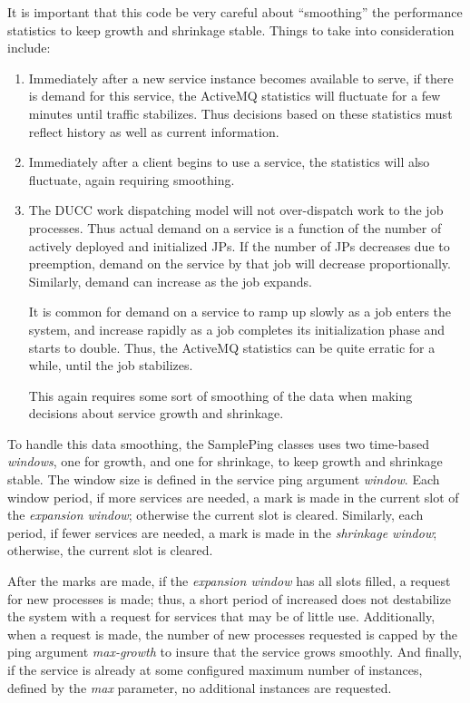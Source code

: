     It is important that this code be very careful about ``smoothing'' the
    performance statistics to keep growth and shrinkage stable.  Things
    to take into consideration include:
    \begin{enumerate}
      \item Immediately after a new service instance becomes available to
        serve, if there is demand for this service, the ActiveMQ statistics
        will fluctuate for a few minutes until traffic stabilizes.  Thus
        decisions based on these statistics must reflect history as well as
        current information.

      \item Immediately after a client begins to use a service, the statistics
        will also fluctuate, again requiring smoothing.

      \item The DUCC work dispatching model will not over-dispatch work to the
        job processes.  Thus actual demand on a service is a function of the
        number of actively deployed and initialized JPs.  If the number of
        JPs decreases due to preemption, demand on the service by that job
        will decrease proportionally.  Similarly, demand can increase as the
        job expands.  

        It is common for demand on a service to ramp up slowly as
        a job enters the system, and increase rapidly as a job completes its
        initialization phase and starts to double.  Thus, the ActiveMQ statistics
        can be quite erratic for a while, until the job stabilizes.

        This again requires some sort of smoothing of the data when making
        decisions about service growth and shrinkage.
    \end{enumerate}
    
    To handle this data smoothing, the SamplePing classes uses two time-based {\em windows}, one for
    growth, and one for shrinkage, to keep growth and shrinkage stable.  The window size is defined
    in the service ping argument {\em window}.
    Each window period, if more
    services are needed, a mark is made in the current slot of the {\em expansion window}; otherwise
    the current slot is cleared.  Similarly, each period, if fewer services are needed, a mark is
    made in the {\em shrinkage window}; otherwise, the current slot is cleared.

    After the marks are made, if the {\em expansion window} has all slots filled,
    a request for new processes is made; thus, a short period of increased does not
    destabilize the system with a request for services that may be of little use.  
    Additionally, when a request is made, the number of new processes requested is
    capped by the ping argument {\em max-growth} to insure that the service
    grows smoothly.  And finally, if the service is already at some configured maximum
    number of instances, defined by the {\em max} parameter, no additional instances
    are requested.

